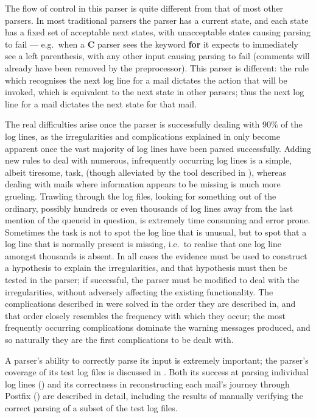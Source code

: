 The flow of control in this parser is quite different from that of most
other parsers.  In most traditional parsers the parser has a current state,
and each state has a fixed set of acceptable next states, with unacceptable
states causing parsing to fail --- e.g.\ when a \textbf{C} parser sees the
keyword \textbf{for} it expects to immediately see a left parenthesis, with
any other input causing parsing to fail (comments will already have been
removed by the preprocessor).  This parser is different: the rule which
recognises the next log line for a mail dictates the action that will be
invoked, which is equivalent to the next state in other parsers; thus the
next log line for a mail dictates the next state for that mail.

The real difficulties arise once the parser is successfully dealing with
90\% of the log lines, as the irregularities and complications explained in
 only become apparent once the vast majority of
log lines have been parsed successfully.  Adding new rules to deal with
numerous, infrequently occurring log lines is a simple, albeit tiresome,
task, (though alleviated by the tool described in ), whereas dealing with mails where information
appears to be missing is much more grueling.  Trawling through the log
files, looking for something out of the ordinary, possibly hundreds or even
thousands of log lines away from the last mention of the queueid in
question, is extremely time consuming and error prone.  Sometimes the task
is not to spot the log line that is unusual, but to spot that a log line
that is normally present is missing, i.e.\ to realise that one log line
amongst thousands is absent.  In all cases the evidence must be used to
construct a hypothesis to explain the irregularities, and that hypothesis
must then be tested in the parser; if successful, the parser must be
modified to deal with the irregularities, without adversely affecting the
existing functionality.  The complications described in
 were solved in the order they are described in,
and that order closely resembles the frequency with which they occur; the
most frequently occurring complications dominate the warning messages
produced, and so naturally they are the first complications to be dealt
with.

A parser's ability to correctly parse its input is extremely important; the
parser's coverage of its test log files is discussed in .  Both its success at parsing individual log lines
() and its correctness in reconstructing each
mail's journey through Postfix () are described
in detail, including the results of manually verifying the correct parsing
of a subset of the test log files.



